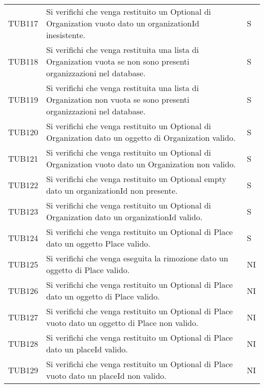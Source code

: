 {\begin{longtable}{ c C{13cm} C{1cm}}
TUB117 & Si verifichi che venga restituito un Optional di Organization vuoto dato un organizationId inesistente. & S \\
TUB118 & Si verifichi che venga restituita una lista di Organization vuota se non sono presenti organizzazioni nel database. & S \\
TUB119 & Si verifichi che venga restituita una lista di Organization non vuota se sono presenti organizzazioni nel database. & S \\
TUB120 & Si verifichi che venga restituito un Optional di Organization dato un oggetto di Organization valido. & S \\
TUB121 & Si verifichi che venga restituito un Optional di Organization vuoto dato un Organization non valido. & S \\
TUB122 & Si verifichi che venga restituito un Optional empty dato un organizationId non presente. & S \\
TUB123 & Si verifichi che venga restituito un Optional di Organization dato un organizationId valido. & S \\
TUB124 & Si verifichi che venga restituito un Optional di Place dato un oggetto Place valido. & S \\
TUB125 & Si verifichi che venga eseguita la rimozione dato un oggetto di Place valido. & NI \\
TUB126 & Si verifichi che venga restituito un Optional di Place dato un oggetto di Place valido. & NI \\
TUB127 & Si verifichi che venga restituito un Optional di Place vuoto dato un oggetto di Place non valido. & NI \\
TUB128 & Si verifichi che venga restituito un Optional di Place dato un placeId valido. & NI \\
TUB129 & Si verifichi che venga restituito un Optional di Place vuoto dato un placeId non valido. & NI \\

\end{longtable}
}
